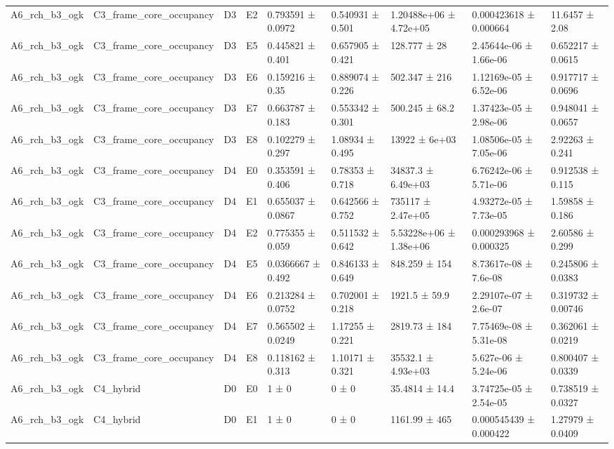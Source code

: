 \begin{table}
\begin{tabular}{lllllllll}
A6\_rch\_b3\_ogk & C3\_frame\_core\_occupancy & D3 & E2 & 0.793591 ± 0.0972 & 0.540931 ± 0.501 & 1.20488e+06 ± 4.72e+05 & 0.000423618 ± 0.000664 & 11.6457 ± 2.08 \\
A6\_rch\_b3\_ogk & C3\_frame\_core\_occupancy & D3 & E5 & 0.445821 ± 0.401 & 0.657905 ± 0.421 & 128.777 ± 28 & 2.45644e-06 ± 1.66e-06 & 0.652217 ± 0.0615 \\
A6\_rch\_b3\_ogk & C3\_frame\_core\_occupancy & D3 & E6 & 0.159216 ± 0.35 & 0.889074 ± 0.226 & 502.347 ± 216 & 1.12169e-05 ± 6.52e-06 & 0.917717 ± 0.0696 \\
A6\_rch\_b3\_ogk & C3\_frame\_core\_occupancy & D3 & E7 & 0.663787 ± 0.183 & 0.553342 ± 0.301 & 500.245 ± 68.2 & 1.37423e-05 ± 2.98e-06 & 0.948041 ± 0.0657 \\
A6\_rch\_b3\_ogk & C3\_frame\_core\_occupancy & D3 & E8 & 0.102279 ± 0.297 & 1.08934 ± 0.495 & 13922 ± 6e+03 & 1.08506e-05 ± 7.05e-06 & 2.92263 ± 0.241 \\
A6\_rch\_b3\_ogk & C3\_frame\_core\_occupancy & D4 & E0 & 0.353591 ± 0.406 & 0.78353 ± 0.718 & 34837.3 ± 6.49e+03 & 6.76242e-06 ± 5.71e-06 & 0.912538 ± 0.115 \\
A6\_rch\_b3\_ogk & C3\_frame\_core\_occupancy & D4 & E1 & 0.655037 ± 0.0867 & 0.642566 ± 0.752 & 735117 ± 2.47e+05 & 4.93272e-05 ± 7.73e-05 & 1.59858 ± 0.186 \\
A6\_rch\_b3\_ogk & C3\_frame\_core\_occupancy & D4 & E2 & 0.775355 ± 0.059 & 0.511532 ± 0.642 & 5.53228e+06 ± 1.38e+06 & 0.000293968 ± 0.000325 & 2.60586 ± 0.299 \\
A6\_rch\_b3\_ogk & C3\_frame\_core\_occupancy & D4 & E5 & 0.0366667 ± 0.492 & 0.846133 ± 0.649 & 848.259 ± 154 & 8.73617e-08 ± 7.6e-08 & 0.245806 ± 0.0383 \\
A6\_rch\_b3\_ogk & C3\_frame\_core\_occupancy & D4 & E6 & 0.213284 ± 0.0752 & 0.702001 ± 0.218 & 1921.5 ± 59.9 & 2.29107e-07 ± 2.6e-07 & 0.319732 ± 0.00746 \\
A6\_rch\_b3\_ogk & C3\_frame\_core\_occupancy & D4 & E7 & 0.565502 ± 0.0249 & 1.17255 ± 0.221 & 2819.73 ± 184 & 7.75469e-08 ± 5.31e-08 & 0.362061 ± 0.0219 \\
A6\_rch\_b3\_ogk & C3\_frame\_core\_occupancy & D4 & E8 & 0.118162 ± 0.313 & 1.10171 ± 0.321 & 35532.1 ± 4.93e+03 & 5.627e-06 ± 5.24e-06 & 0.800407 ± 0.0339 \\
A6\_rch\_b3\_ogk & C4\_hybrid & D0 & E0 & 1 ± 0 & 0 ± 0 & 35.4814 ± 14.4 & 3.74725e-05 ± 2.54e-05 & 0.738519 ± 0.0327 \\
A6\_rch\_b3\_ogk & C4\_hybrid & D0 & E1 & 1 ± 0 & 0 ± 0 & 1161.99 ± 465 & 0.000545439 ± 0.000422 & 1.27979 ± 0.0409 \\

\end{tabular}
\end{table}
